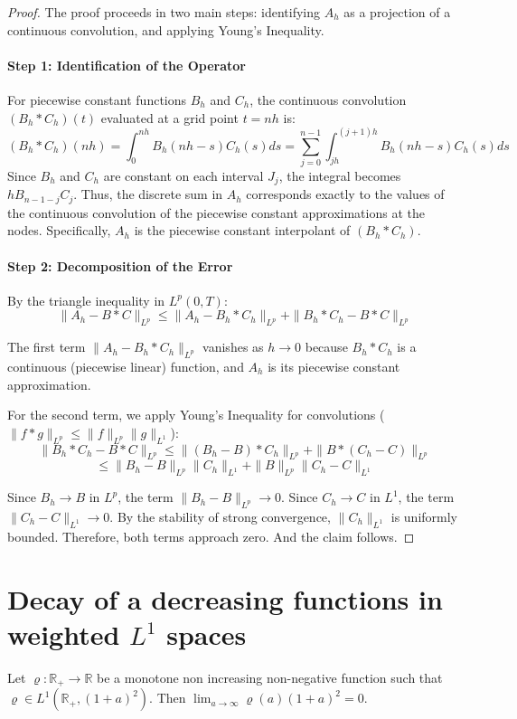 \documentclass[]{jnsao}
\newcommand{\kernel}{\varrho}
\begin{document}
\begin{proof}
The proof proceeds in two main steps: identifying $A_h$ as a projection of a continuous convolution, and applying Young's Inequality.

\paragraph{Step 1: Identification of the Operator}
For piecewise constant functions $B_h$ and $C_h$, the continuous convolution $(B_h * C_h)(t)$ evaluated at a grid point $t = nh$ is:
\[ (B_h * C_h)(nh) = \int_0^{nh} B_h(nh-s)C_h(s)ds = \sum_{j=0}^{n-1} \int_{jh}^{(j+1)h} B_h(nh-s)C_h(s)ds \]
Since $B_h$ and $C_h$ are constant on each interval $J_j$, the integral becomes $h B_{n-1-j} C_j$. Thus, the discrete sum in $A_h$ corresponds exactly to the values of the continuous convolution of the piecewise constant approximations at the nodes. Specifically, $A_h$ is the piecewise constant interpolant of $(B_h * C_h)$.

\paragraph{Step 2: Decomposition of the Error}
By the triangle inequality in $L^p(0,T)$:
\[ \|A_h - B * C\|_{L^p} \leq \|A_h - B_h * C_h\|_{L^p} + \|B_h * C_h - B * C\|_{L^p} \]

The first term $\|A_h - B_h * C_h\|_{L^p}$ vanishes as $h \to 0$ because $B_h * C_h$ is a continuous (piecewise linear) function, and $A_h$ is its piecewise constant approximation. 

For the second term, we apply Young's Inequality for convolutions ($\|f * g\|_{L^p} \leq \|f\|_{L^p}\|g\|_{L^1}$):
\[ \|B_h * C_h - B * C\|_{L^p} \leq \|(B_h - B) * C_h\|_{L^p} + \|B * (C_h - C)\|_{L^p} \]
\[ \leq \|B_h - B\|_{L^p}\|C_h\|_{L^1} + \|B\|_{L^p}\|C_h - C\|_{L^1} \]

Since $B_h \to B$ in $L^p$, the term $\|B_h - B\|_{L^p} \to 0$. Since $C_h \to C$ in $L^1$, the term $\|C_h - C\|_{L^1} \to 0$. By the stability of strong convergence, $\|C_h\|_{L^1}$ is uniformly bounded. Therefore, both terms approach zero.
And the claim follows.
\end{proof}

\section{Decay of a decreasing functions in weighted \(L^1\) spaces}\label{sec:decay_lipschitz}
\begin{proposition}\label{prop:decay_weighted}
Let $\kernel: \mathbb{R}_+ \to \mathbb{R}$ be a monotone non increasing non-negative function such that 
$\kernel \in L^1(\mathbb{R}_+, (1+a)^2)$. 
Then $\lim_{a \to \infty} \kernel(a)(1+a)^2 = 0$.
\end{proposition}
\end{document}
